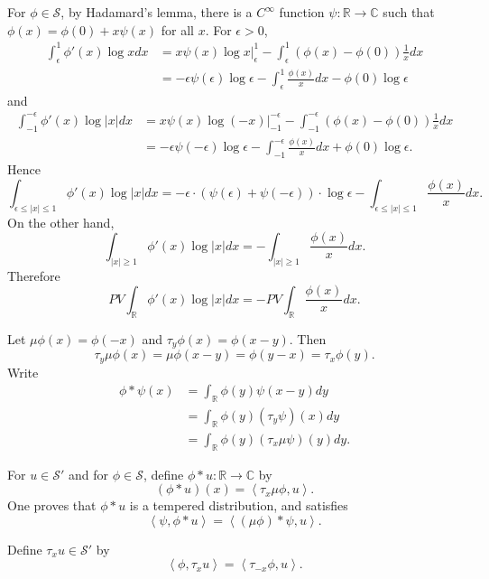 \documentclass{article}
\newcommand{\inner}[2]{\left\langle #1, #2 \right\rangle}
\theoremstyle{definition}
\begin{document}
For $\phi \in \mathscr{S}$,
by Hadamard's lemma, there is a $C^\infty$ function $\psi:\mathbb{R} \to \mathbb{C}$ such that
$\phi(x)=\phi(0)+x \psi(x)$ for all $x$. For $\epsilon>0$,
\begin{align*}
\int_\epsilon^1 \phi'(x) \log x dx&=x \psi(x) \log x \bigg|_\epsilon^1 - \int_\epsilon^1 (\phi(x)-\phi(0)) \frac{1}{x} dx\\
&=-\epsilon \psi(\epsilon) \log \epsilon - \int_\epsilon^1 \frac{\phi(x)}{x} dx - \phi(0) \log \epsilon
\end{align*}
and
\begin{align*}
\int_{-1}^{-\epsilon} \phi'(x) \log|x| dx&=x \psi(x) \log(-x) \bigg|_{-1}^{-\epsilon} - \int_{-1}^{-\epsilon} (\phi(x)-\phi(0)) \frac{1}{x} dx\\
&=-\epsilon \psi(-\epsilon) \log \epsilon - \int_{-1}^{-\epsilon} \frac{\phi(x)}{x} dx 
+\phi(0) \log \epsilon.
\end{align*}
Hence
\[
\int_{\epsilon \leq |x| \leq 1} \phi'(x) \log |x| dx = -\epsilon \cdot (\psi(\epsilon)+\psi(-\epsilon)) \cdot \log \epsilon - 
\int_{\epsilon \leq |x| \leq 1} \frac{\phi(x)}{x} dx.
\]
On the other hand,
\[
\int_{|x| \geq 1} \phi'(x) \log |x| dx = - \int_{|x| \geq 1} \frac{\phi(x)}{x} dx.
\]
Therefore
\[
PV  \int_{\mathbb{R}} \phi'(x) \log |x| dx = - PV \int_{\mathbb{R}} \frac{\phi(x)}{x} dx.
\]



Let $\mu \phi(x)=\phi(-x)$ and $\tau_y \phi(x)=\phi(x-y)$.
Then
\[
\tau_y \mu \phi(x) = \mu \phi(x-y) = \phi(y-x) = \tau_x \phi(y).
\]
Write
\begin{align*}
\phi * \psi(x) &= \int_{\mathbb{R}} \phi(y) \psi(x-y) dy\\
&=\int_{\mathbb{R}} \phi(y) (\tau_y \psi)(x) dy\\
&=\int_{\mathbb{R}} \phi(y) (\tau_x \mu \psi)(y) dy.
\end{align*}

For $u \in \mathscr{S}'$
and for $\phi \in \mathscr{S}$, define
$\phi * u:\mathbb{R} \to \mathbb{C}$ by
\[
(\phi * u)(x) = \inner{\tau_x \mu \phi}{u}.
\]
One  proves that $\phi*u$ is a tempered distribution, and satisfies
\[
\inner{\psi}{\phi*u} = \inner{(\mu \phi)*\psi}{u}.
\]


Define $\tau_x u \in \mathscr{S}'$ by
\[
\inner{\phi}{\tau_x u} = \inner{\tau_{-x} \phi}{u}.
\]
\end{document}
